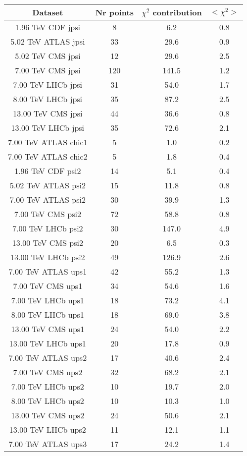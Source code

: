 \begin{table}[h!]
\centering
\begin{tabular}{c|c|c|c}
Dataset & Nr points & $\chi^2$ contribution & $<\chi^2>$ \\
\hline
1.96 TeV CDF jpsi & 8 & 6.2 & 0.8 \\
5.02 TeV ATLAS jpsi & 33 & 29.6 & 0.9 \\
5.02 TeV CMS jpsi & 12 & 29.6 & 2.5 \\
7.00 TeV CMS jpsi & 120 & 141.5 & 1.2 \\
7.00 TeV LHCb jpsi & 31 & 54.0 & 1.7 \\
8.00 TeV LHCb jpsi & 35 & 87.2 & 2.5 \\
13.00 TeV CMS jpsi & 44 & 36.6 & 0.8 \\
13.00 TeV LHCb jpsi & 35 & 72.6 & 2.1 \\
7.00 TeV ATLAS chic1 & 5 & 1.0 & 0.2 \\
7.00 TeV ATLAS chic2 & 5 & 1.8 & 0.4 \\
1.96 TeV CDF psi2 & 14 & 5.1 & 0.4 \\
5.02 TeV ATLAS psi2 & 15 & 11.8 & 0.8 \\
7.00 TeV ATLAS psi2 & 30 & 39.9 & 1.3 \\
7.00 TeV CMS psi2 & 72 & 58.8 & 0.8 \\
7.00 TeV LHCb psi2 & 30 & 147.0 & 4.9 \\
13.00 TeV CMS psi2 & 20 & 6.5 & 0.3 \\
13.00 TeV LHCb psi2 & 49 & 126.9 & 2.6 \\
7.00 TeV ATLAS ups1 & 42 & 55.2 & 1.3 \\
7.00 TeV CMS ups1 & 34 & 54.6 & 1.6 \\
7.00 TeV LHCb ups1 & 18 & 73.2 & 4.1 \\
8.00 TeV LHCb ups1 & 18 & 69.0 & 3.8 \\
13.00 TeV CMS ups1 & 24 & 54.0 & 2.2 \\
13.00 TeV LHCb ups1 & 20 & 17.8 & 0.9 \\
7.00 TeV ATLAS ups2 & 17 & 40.6 & 2.4 \\
7.00 TeV CMS ups2 & 32 & 68.2 & 2.1 \\
7.00 TeV LHCb ups2 & 10 & 19.7 & 2.0 \\
8.00 TeV LHCb ups2 & 10 & 10.3 & 1.0 \\
13.00 TeV CMS ups2 & 24 & 50.6 & 2.1 \\
13.00 TeV LHCb ups2 & 11 & 12.1 & 1.1 \\
7.00 TeV ATLAS ups3 & 17 & 24.2 & 1.4 \\

\end{tabular}
\end{table}

